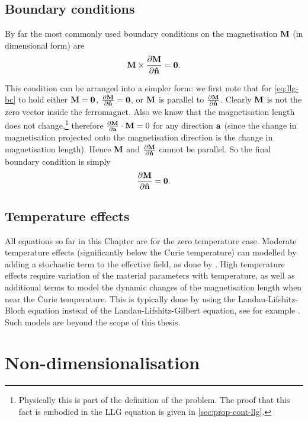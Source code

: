 \subsection{Boundary conditions}
\label{sec:magn-bound-cond}

By far the most commonly used boundary conditions on the magnetisation $\mathbf{M}$ (in dimensional form) are \cite[178, 181]{Aharoni1996}
\begin{equation}
  \label{eq:llg-bc}
  \mathbf{M} \times \frac{\partial \mathbf{M}}{\partial \mathbf{\hat{n}}} = \mathbf{0}.
\end{equation}

This condition can be arranged into a simpler form: we first note that for \cref{eq:llg-bc} to hold either $\mathbf{M} = \mathbf{0}$, $\frac{\partial \mathbf{M}}{\partial \mathbf{\hat{n}}} = \mathbf{0}$, or $\mathbf{M}$ is parallel to $\frac{\partial \mathbf{M}}{\partial \mathbf{\hat{n}}}$.
Clearly $\mathbf{M}$ is not the zero vector inside the ferromagnet.
Also we know that the magnetisation length does not change,\footnote{Physically this is part of the definition of the problem. The proof that this fact is embodied in the LLG equation is given in \cref{sec:prop-cont-llg}.} therefore $\frac{\partial \mathbf{M}}{\partial {\mathbf{a}}} \cdot \mathbf{M} = 0$ for any direction ${\mathbf{a}}$ (since the change in magnetisation projected onto the magnetisation direction is the change in magnetisation length). 
Hence $\mathbf{M}$ and $\frac{\partial \mathbf{M}}{\partial \mathbf{\hat{n}}}$ cannot be parallel.
So the final boundary condition is simply
\begin{equation}
  \frac{\partial \mathbf{M}}{\partial \mathbf{\hat{n}}} = \mathbf{0}.
\end{equation}

\subsection{Temperature effects}
\label{sec:temperature-effects}
All equations so far in this Chapter are for the zero temperature case.
Moderate temperature effects (significantly below the Curie temperature) can modelled by adding a stochastic term to the effective field, as done by \eg \cite{DAquino2006}.
High temperature effects require variation of the material parameters with temperature, as well as additional terms to model the dynamic changes of the magnetisation length when near the Curie temperature.
This is typically done by using the Landau-Lifshitz-Bloch equation instead of the Landau-Lifshitz-Gilbert equation, see for example \cite{Evans2012}.
Such models are beyond the scope of this thesis.


\section{Non-dimensionalisation}
\label{sec:normalisations-appendix}

